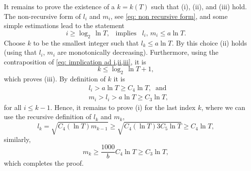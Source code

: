 \documentclass[11pt]{article}
\makeatletter
\renewenvironment{proof}[1][\proofname]{
   \par\pushQED{\qed}\normalfont
   \topsep6\p@\@plus6\p@\relax
   \trivlist\item[\hskip\labelsep\bfseries#1\@addpunct{.}]
   \ignorespaces
}{
   \popQED\endtrivlist\@endpefalse
}
\numberwithin{equation}{section}
\makeatother
\begin{document}
\begin{proof}[Proof of Theorem \ref{log fluctuation}]
  It remains to prove the existence of a $k=k(T)$ such that (i), (ii), and (iii) hold. 
  The non-recursive form of $l_i$ and $m_i$, see \eqref{eq: non recursive form}, 
  and some simple estimations lead to the statement
  \begin{equation}\label{eq: implication ad i,ii,iii}
     i \geq \log_2 \, \ln T, \; \; \;
     \text{implies} \;\;\;
     l_i, \, m_i \leq a \ln T.
  \end{equation}
  Choose $k$ to be the smallest integer 
  such that $l_k \leq a \ln T$. By this 
  choice (ii) holds 
  (using that $l_i$, $m_i$ are monotonically 
  decreasing). 
  Furthermore, using the contraposition 
  of \eqref{eq: implication ad i,ii,iii}, 
  it is 
  $$ k \leq \log_2 \, \ln T + 1,$$ 
  which proves (iii). 
  By definition of $k$ it is
  \begin{equation}\nonumber
    \begin{split}
      & l_i > a \ln T \geq C_4 \ln T, \; \;\text{and} \\
      & m_i > l_i > a \ln T \geq C_3 \ln T,
    \end{split}
  \end{equation}
  for all $i \leq k-1$.
  Hence, it remains to prove (i) for the last index $k$, where we can use the recursive 
  definition of $l_k$ and $m_k$, 
  \begin{equation}\nonumber
    l_k = \sqrt{C_4 (\ln T) m_{k-1}}
    \geq \sqrt{C_4 (\ln T) 3 C_5 \ln T} 
    \geq C_4 \ln T,
  \end{equation}
  similarly,
  \begin{equation}\nonumber
    m_k \geq \frac{1000}{b} C_4 \ln T 
        \geq C_3 \ln T,    
  \end{equation}
  which completes the proof.
\end{proof}
\end{document}
